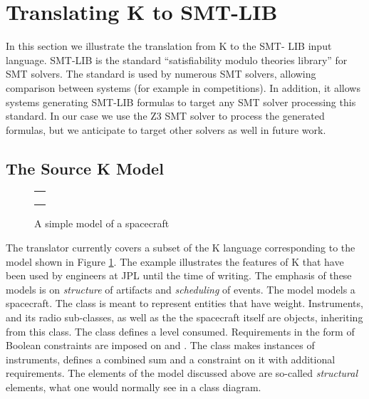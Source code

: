 
\section{Translating K to SMT-LIB}
\label{sec:k2smt}

In this section we illustrate the translation from K to the SMT-
LIB input language. SMT-LIB \cite{smt-lib} is the standard 
``satisfiability modulo theories library'' for SMT solvers. The 
standard is used by numerous SMT solvers, allowing comparison 
between systems (for example in competitions). 
In addition, it allows systems generating SMT-LIB 
formulas to target any SMT solver processing this standard. In our 
case we  use the Z3 SMT solver to process the generated formulas, 
but we anticipate to target other solvers as well in future work.

\subsection{The Source K Model}

\begin{figure}
\centering
\begin{tabular}{c}
\hline \\
 \\ \\
\hline
\end{tabular}
\caption{A simple \Klang{} model of a spacecraft}
\label{fig:spacecraftSmt}
\end{figure}

The translator currently covers a subset of the K language
corresponding to the model shown in Figure 
\ref{fig:spacecraftSmt}. The example illustrates the features
of K that have been used by engineers at JPL until the time of 
writing. The emphasis of these models is on {\em structure}
of artifacts and {\em scheduling} of events. The model models a 
spacecraft. The class  is meant to represent entities 
that have weight. Instruments, and its radio sub-classes, as well
as the the spacecraft itself are objects, inheriting from this 
class. The class  defines a  level 
consumed. Requirements in the form of Boolean constraints are 
imposed on  and . The 
 class makes instances of instruments,
defines a combined sum  and a
constraint on it with additional requirements. The elements of
the model discussed above are so-called {\em structural} elements,
what one would normally see in a class diagram.

